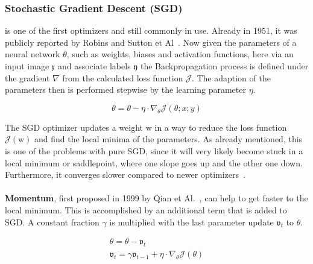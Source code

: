 %
\subsubsection{Stochastic Gradient Descent (SGD)} is one of the first optimizers and still commonly in use.
Already in 1951, it was publicly reported by Robins and Sutton et Al~\cite{sgd}.
Now given the parameters of a neural network $\theta$, such as weights, biases and activation functions, here via an input image
$\mathfrak{x}$ and associate labels $\mathfrak{y}$ the Backpropagation process is defined under the gradient $\nabla$
from the calculated loss function $\mathcal{J}$.
The adaption of the parameters then is performed stepwise by the learning parameter $\eta$.


\begin{equation}
    \theta = \theta - \eta\cdot\nabla_\theta\mathcal{J}(\theta;x;y)
    \label{eqn:sgd}
\end{equation}

The SGD optimizer updates a weight $\mathrm{w}$ in a way to reduce the loss function $\mathcal{J}(\mathrm{w})$ and find
the local minima of the parameters.
As already mentioned, this is one of the problems with pure SGD, since it will very likely become stuck in a local minimum or
saddlepoint, where one slope goes up and the other one down.
Furthermore, it converges slower compared to newer optimizers~\cite{optimizersoverview, optimizersexplained}.
\\\mbox{}\\
\textbf{Momentum}, first proposed in 1999 by Qian et Al.~\cite{momentum}, can help to get faster to the local minimum.
This is accomplished by an additional term that is added to SGD.
A constant fraction $\gamma$ is multiplied with the last parameter update $\mathfrak{v}_t$ to $\theta$.

\begin{align}
    \theta = \theta - \mathfrak{v}_t \label{eqn:momentum:1}\\
    \mathfrak{v}_t = \gamma\mathfrak{v}_{t-1} + \eta\cdot\nabla_\theta\mathcal{J}(\theta) \label{eqn:momentum:2}
\end{align}

